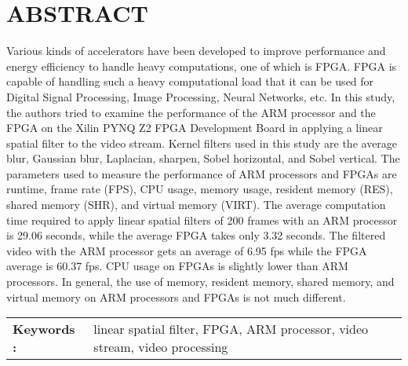 \chapter*{ABSTRACT}

Various kinds of accelerators have been developed to improve performance and energy efficiency to handle heavy computations, one of which is FPGA. FPGA is capable of handling such a heavy computational load that it can be used for Digital Signal Processing, Image Processing, Neural Networks, etc. In this study, the authors tried to examine the performance of the ARM processor and the FPGA on the Xilin PYNQ Z2 FPGA Development Board in applying a linear spatial filter to the video stream. Kernel filters used in this study are the average blur, Gaussian blur, Laplacian, sharpen, Sobel horizontal, and Sobel vertical. The parameters used to measure the performance of ARM processors and FPGAs are runtime, frame rate (FPS), CPU usage, memory usage, resident memory (RES), shared memory (SHR), and virtual memory (VIRT). The average computation time required to apply linear spatial filters of 200 frames with an ARM processor is 29.06 seconds, while the average FPGA takes only 3.32 seconds. The filtered video with the ARM processor gets an average of 6.95 fps while the FPGA average is 60.37 fps. CPU usage on FPGAs is slightly lower than ARM processors. In general, the use of memory, resident memory, shared memory, and virtual memory on ARM processors and FPGAs is not much different. 


\begin{table}[h]
    \begin{tabular}{ p{} p{} }
        \\
        \textbf{Keywords :} & linear spatial filter, FPGA, ARM processor, video stream, video processing
    \end{tabular}
\end{table}